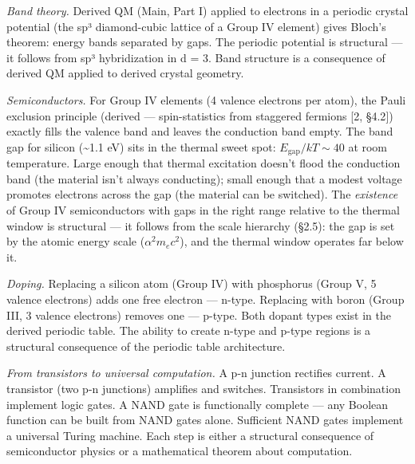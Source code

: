 \documentclass[
]{article}
\begin{document}
\emph{Band theory.} Derived QM (Main, Part I) applied to electrons in a
periodic crystal potential (the sp³ diamond-cubic lattice of a Group IV
element) gives Bloch's theorem: energy bands separated by gaps. The
periodic potential is structural --- it follows from sp³ hybridization
in d = 3. Band structure is a consequence of derived QM applied to
derived crystal geometry.

\emph{Semiconductors.} For Group IV elements (4 valence electrons per
atom), the Pauli exclusion principle (derived --- spin-statistics from
staggered fermions {[}2, §4.2{]}) exactly fills the valence band and
leaves the conduction band empty. The band gap for silicon
(\textasciitilde1.1 eV) sits in the thermal sweet spot:
\(E_{\text{gap}} / kT \sim 40\) at room temperature. Large enough that
thermal excitation doesn't flood the conduction band (the material isn't
always conducting); small enough that a modest voltage promotes
electrons across the gap (the material can be switched). The
\emph{existence} of Group IV semiconductors with gaps in the right range
relative to the thermal window is structural --- it follows from the
scale hierarchy (§2.5): the gap is set by the atomic energy scale
(\(\alpha^2 m_e c^2\)), and the thermal window operates far below it.

\emph{Doping.} Replacing a silicon atom (Group IV) with phosphorus
(Group V, 5 valence electrons) adds one free electron --- n-type.
Replacing with boron (Group III, 3 valence electrons) removes one ---
p-type. Both dopant types exist in the derived periodic table. The
ability to create n-type and p-type regions is a structural consequence
of the periodic table architecture.

\emph{From transistors to universal computation.} A p-n junction
rectifies current. A transistor (two p-n junctions) amplifies and
switches. Transistors in combination implement logic gates. A NAND gate
is functionally complete --- any Boolean function can be built from NAND
gates alone. Sufficient NAND gates implement a universal Turing machine.
Each step is either a structural consequence of semiconductor physics or
a mathematical theorem about computation.
\end{document}
